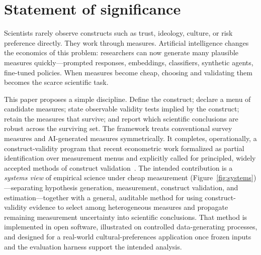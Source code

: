 \documentclass[10pt,letterpaper]{article}
\begin{document}
\vspace{0.85em}
\section*{Statement of significance}
Scientists rarely observe constructs such as trust, ideology, culture, or risk preference directly. They work through measures.
Artificial intelligence changes the economics of this problem: researchers can now generate many plausible measures quickly---prompted responses, embeddings, classifiers, synthetic agents, fine-tuned policies.
When measures become cheap, choosing and validating them becomes the scarce scientific task.

This paper proposes a simple discipline.
Define the construct; declare a menu of candidate measures; state observable validity tests implied by the construct; retain the measures that survive; and report which scientific conclusions are robust across the surviving set.
The framework treats conventional survey measures and AI-generated measures symmetrically.
It completes, operationally, a construct-validity program that recent econometric work formalized as partial identification over measurement menus and explicitly called for principled, widely accepted methods of construct validation~\cite{dellrambachan2026}.
The intended contribution is a \emph{systems view} of empirical science under cheap measurement (Figure~\ref{fig:systems})---separating hypothesis generation, measurement, construct validation, and estimation---together with a general, auditable method for using construct-validity evidence to select among heterogeneous measures and propagate remaining measurement uncertainty into scientific conclusions.
That method is implemented in open software, illustrated on controlled data-generating processes, and designed for a real-world cultural-preferences application once frozen inputs and the evaluation harness support the intended analysis.
\end{document}
